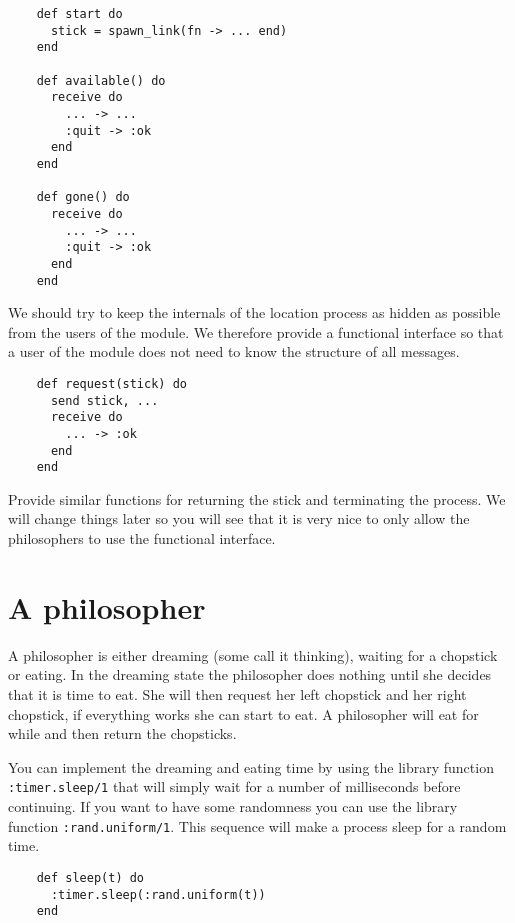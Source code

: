 \documentclass[a4paper,11pt]{article}
\begin{document}
    \begin{verbatim}
    def start do
      stick = spawn_link(fn -> ... end)
    end
    
    def available() do
      receive do
        ... -> ...
        :quit -> :ok
      end
    end
    
    def gone() do
      receive do
        ... -> ...
        :quit -> :ok
      end
    end
    \end{verbatim}
    
    We should try to keep the internals of the location process as hidden
    as possible from the users of the module. We therefore provide a
    functional interface so that a user of the module does not need to
    know the structure of all messages.
    
    \begin{verbatim}
    def request(stick) do
      send stick, ...
      receive do
        ... -> :ok
      end
    end
    \end{verbatim}
    
    Provide similar functions for returning the stick and terminating the
    process. We will change things later so you will see that it is very
    nice to only allow the philosophers to use the functional interface.
    
    
    
    \section{A philosopher}
    
    A philosopher is either dreaming (some call it thinking), waiting for
    a chopstick or eating. In the dreaming state the philosopher does
    nothing until she decides that it is time to eat. She will then
    request her left chopstick and her right chopstick, if everything
    works she can start to eat. A philosopher will eat for while and then
    return the chopsticks.
    
    You can implement the dreaming and eating time by using the library
    function {\tt :timer.sleep/1} that will simply wait for a number of
    milliseconds before continuing. If you want to have some randomness
    you can use the library function {\tt :rand.uniform/1}. This sequence
    will make a process sleep for a random time.
    
    \begin{verbatim}
    def sleep(t) do 
      :timer.sleep(:rand.uniform(t))
    end
    \end{verbatim}
    
\end{document}
